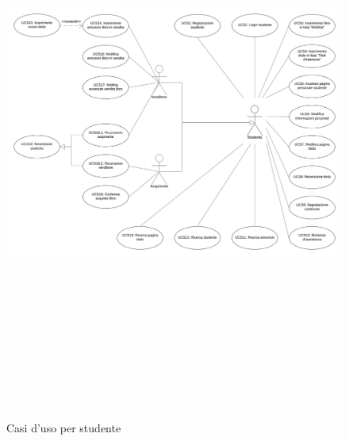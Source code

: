 \documentclass[10pt,a4paper]{report}
\begin{document}
	\begin{figure}[H]
		\centering
		\includegraphics[height=19cm, width=17cm, keepaspectratio]{st_uc}
		\caption{Casi d'uso per studente}
	\end{figure}
\end{document}
